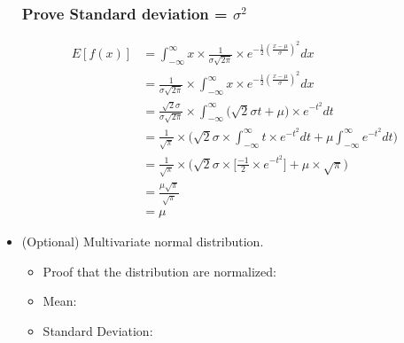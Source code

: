 \documentclass{article}
\begin{document}
\begin{itemize}
            \subsubsection{Prove Standard deviation = $\sigma^2$}
                \begin{equation}
                    \begin{split}
                        E[f(x)] & = \int_{-\infty}^{\infty} x \times \frac{1}{\sigma\sqrt{2\pi}}\times e^{ -\frac{1}{2}(\frac{x - \mu}{\sigma})^2}dx \\
                                & = \frac{1}{\sigma\sqrt{2\pi}} \times \int_{-\infty}^{\infty} x  \times e^{ -\frac{1}{2}(\frac{x - \mu}{\sigma})^2}dx \\
                                & = \frac{\sqrt{2}\sigma}{\sigma\sqrt{2\pi}} \times \int_{-\infty}^{\infty} \Big(\sqrt{2} \sigma t + \mu\Big) \times e^{-t^2}dt \\ 
                                & = \frac{1}{\sqrt{\pi}} \times \Bigg(\sqrt{2} \sigma \times
                                \int_{-\infty}^{\infty}  t \times e^{-t^2} dt + \mu \int_{-\infty}^{\infty} e^{-t^2}dt\Bigg) \\ 
                                & = \frac{1}{\sqrt{\pi}} \times \Bigg(\sqrt{2} \sigma \times
                                \Bigg[\frac{-1}{2} \times e^{-t^2}\Bigg] + \mu \times \sqrt{\pi}\Bigg)\\
                                & = \frac{\mu \sqrt{\pi}}{\sqrt{\pi}}\\
                                & = \mu
                    \end{split}
                \end{equation}
            \item (Optional) Multivariate normal distribution. 
                \begin{itemize}
                    \item Proof that the distribution are normalized:
                    \item Mean:
                    \item Standard Deviation:
                \end{itemize}
        \end{itemize}
        
\end{document}
